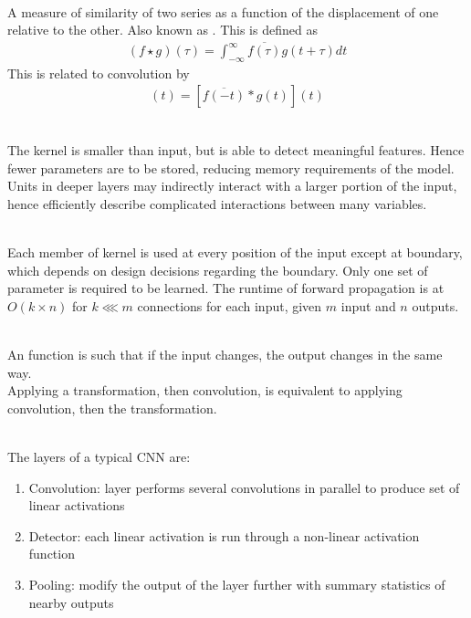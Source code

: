 \begin{definition} \\
A measure of similarity of two series as a function of the displacement of one relative to the other. Also known as . This is defined as
\begin{align*}
(f \star g)(\tau) = \int_{-\infty}^{\infty} \overline{f(\tau)}g(t + \tau) dt \nonumber
\end{align*}
This is related to convolution by
\begin{align*}
[f(t) \star g{t}](t) = [\overline{f(-t)} \ast g(t)] (t) \nonumber
\end{align*}
\end{definition}

\begin{remark} \\
The kernel is smaller than input, but is able to detect meaningful features. Hence fewer parameters are to be stored, reducing memory requirements of the model. Units in deeper layers may indirectly interact with a larger portion of the input, hence efficiently describe complicated interactions between many variables.
\end{remark}

\begin{remark} \\
Each member of kernel is used at every position of the input except at boundary, which depends on design decisions regarding the boundary. Only one set of parameter is required to be learned. The runtime of forward propagation is at $O(k \times n)$ for $k \lll m$ connections for each input, given $m$ input and $n$ outputs.
\end{remark}

\begin{remark} \\
An  function is such that if the input changes, the output changes in the same way.\\
Applying a transformation, then convolution, is equivalent to applying convolution, then the transformation.
\end{remark}

\begin{remark} \\
The layers of a typical CNN are:
\begin{enumerate}[label=\roman*.]
\setlength{\itemsep}{0pt}
\item Convolution: layer performs several convolutions in parallel to produce set of linear activations
\item Detector: each linear activation is run through a non-linear activation function
\item Pooling: modify the output of the layer further with summary statistics of nearby outputs
\end{enumerate}
\end{remark}


